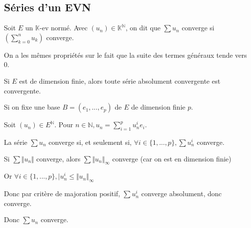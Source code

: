 \documentclass[a4paper,12pt]{book}
\newcommand{\Def}[2]{\begin{tcolorbox}[sharp corners, colback=white,colframe=blue!90!black!75, title=Définition : #1]#2\end{tcolorbox}}
\newcommand{\Prop}[2]{\begin{tcolorbox}[sharp corners, colback=white,colframe=red!90!black!75, title=Proposition : #1]#2\end{tcolorbox}}
\newcommand{\Pre}[1]{\begin{tcolorbox}[sharp corners, colback=white,colframe=green!60!green!30!black!75, title=Preuve]#1\end{tcolorbox}}
\def\N{\mathbb{N}}
\def\K{\mathbb{K}}
\begin{document}
\subsection{Séries d'un EVN}
\Def{Série d'un EVN}{Soit $E$ un $\K$-ev normé. Avec $(u_n)\in\K^\N$, on dit que $\sum u_n$ converge si $\left(\sum\limits_{k=0}^nu_k\right)$ converge.}
On a les mêmes propriétés sur le fait que la suite des termes généraux tende vers 0.
\Prop{Absolue convergence en dimension finie}{Si $E$ est de dimension finie, alors toute série absolument convergente est convergente.}
\Pre{Si on fixe une base $B=(e_1,...,e_p)$ de $E$ de dimension finie $p$.
\par Soit $(u_n)\in E^\N$. Pour $n\in\N, u_n = \sum\limits_{i=1}^pu_n^ie_i$.
\par La série $\sum u_n$ converge si, et seulement si, $\forall i\in\{1,...,p\}, \sum u_n^i$ converge.
\par Si $\sum \Vert u_n\Vert$ converge, alors $\sum\Vert u_n\Vert_\infty$ converge (car on est en dimension finie)
\par Or $\forall i\in\{1,...,p\}, \vert u_n^i\leq\Vert u_n\Vert_\infty$
\par Donc par critère de majoration positif, $\sum u_n^i$ converge absolument, donc converge.
\par Donc $\sum u_n$ converge.}
\end{document}
